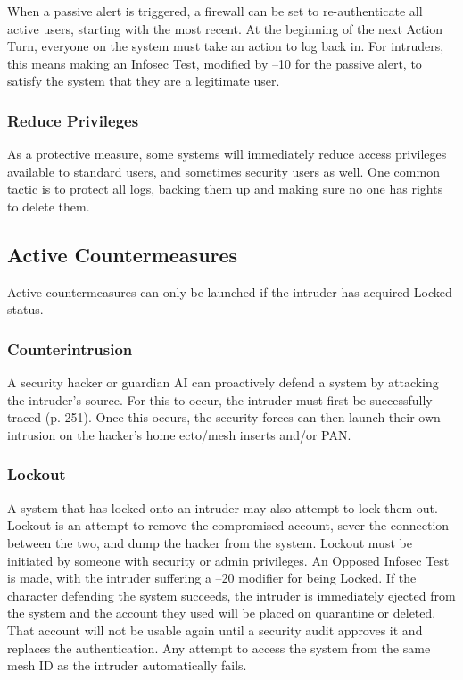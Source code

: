 When a passive alert is triggered, a firewall can be set 
to re-authenticate all active users, starting with the 
most recent. At the beginning of the next Action Turn, 
everyone on the system must take an action to log 
back in. For intruders, this means making an Infosec 
Test, modified by –10 for the passive alert, to satisfy 
the system that they are a legitimate user.

\subsubsection{Reduce Privileges}

As a protective measure, some systems will immediately
reduce access privileges available to standard
users, and sometimes security users as well. One 
common tactic is to protect all logs, backing them up 
and making sure no one has rights to delete them.

\subsection{Active Countermeasures}

Active countermeasures can only be launched if the 
intruder has acquired Locked status.

\subsubsection{Counterintrusion}

A security hacker or guardian AI can proactively 
defend a system by attacking the intruder's source. For 
this to occur, the intruder must first be successfully 
traced (p. 251). Once this occurs, the security forces 
can then launch their own intrusion on the hacker's 
home ecto/mesh inserts and/or PAN.

\subsubsection{Lockout}

A system that has locked onto an intruder may also 
attempt to lock them out. Lockout is an attempt to 
remove the compromised account, sever the connection
between the two, and dump the hacker from
the system.
Lockout must be initiated by someone with security
or admin privileges. An Opposed Infosec Test is
made, with the intruder suffering a –20 modifier for 
being Locked. If the character defending the system 
succeeds, the intruder is immediately ejected from 
the system and the account they used will be placed 
on quarantine or deleted. That account will not be 
usable again until a security audit approves it and 
replaces the authentication. Any attempt to access 
the system from the same mesh ID as the intruder 
automatically fails.

